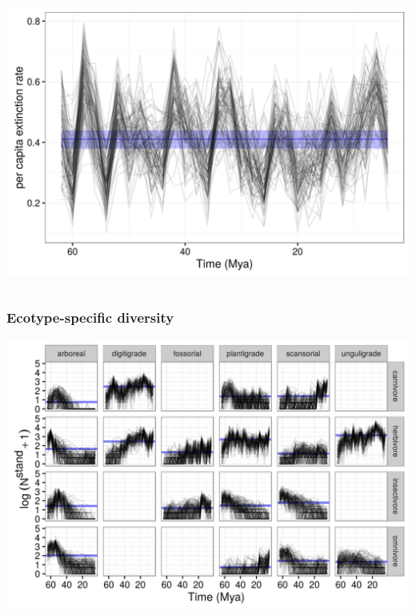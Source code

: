 \documentclass{beamer}
\begin{document}
\begin{frame}
\begin{columns}
\begin{column}{0.5\textwidth}
\begin{center}
        \includegraphics[height=0.4\textheight,width=\textwidth,keepaspectratio=true]{figure/death_rate}
      \end{center}
    \end{column}
  \end{columns}
\end{frame}

\begin{frame}
  \frametitle{Ecotype-specific diversity}
  \begin{center}
    \includegraphics[height=0.8\textheight,width=\textwidth,keepaspectratio=true]{figure/ecotype_diversity}
  \end{center}
\end{frame}

%
\end{document}
